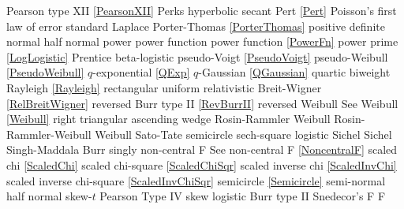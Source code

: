 Pearson type XII 				\dotfill	\eqref{PearsonXII}					\ncite	%
Perks						\dotfill	hyperbolic secant 					\ncite	%
Pert							\dotfill	\eqref{Pert} 						\ncite	%
Poisson's first law of error	\dotfill	standard Laplace					\ncite	%
Porter-Thomas					\dotfill	\eqref{PorterThomas}				\ncite
positive definite normal 		\dotfill	half normal 						\ncite 	%
power							\dotfill	power function 						\ncite	%
power function					\dotfill	\eqref{PowerFn}					\ncite	%
power prime					\dotfill	\eqref{LogLogistic}					\mcite{\self}
Prentice 						\dotfill	beta-logistic							
pseudo-Voigt					\dotfill	\eqref{PseudoVoigt}					\ncite
pseudo-Weibull					\dotfill	\eqref{PseudoWeibull}				\ncite	%
%
$q$-exponential				\dotfill	\eqref{QExp}						\ncite	%
$q$-Gaussian					\dotfill	\eqref{QGaussian}					\ncite	%
quartic						\dotfill	biweight							\ncite
%
Rayleigh  						\dotfill	\eqref{Rayleigh}					\ncite	%
rectangular					\dotfill	uniform 							\ncite	%
relativistic Breit-Wigner			\dotfill	\eqref{RelBreitWigner}				\ncite	%
reversed Burr type II				\dotfill	\eqref{RevBurrII} 					\ncite	%
reversed Weibull				\dotfill	See Weibull \eqref{Weibull}			\ncite	%
right triangular					\dotfill	ascending wedge 					\ncite	%
Rosin-Rammler 				\dotfill	Weibull							   		%
Rosin-Rammler-Weibull 			\dotfill	Weibull							\ncite	%
%
Sato-Tate						\dotfill	semicircle 						\ncite	%
sech-square 					\dotfill	logistic							\ncite	%
Sichel						\dotfill	Sichel							\ncite	
Singh-Maddala 					\dotfill	Burr 								\ncite	%
singly non-central F       			 \dotfill	See non-central F  \eqref{NoncentralF}	\ncite 
scaled chi						\dotfill	\eqref{ScaledChi}					\ncite	%
scaled chi-square 				\dotfill	\eqref{ScaledChiSqr}					\ncite	%
scaled inverse chi 				\dotfill	\eqref{ScaledInvChi}					\ncite	%
scaled inverse chi-square 			\dotfill	\eqref{ScaledInvChiSqr}				 	%
semicircle						\dotfill	\eqref{Semicircle}					\ncite	%
semi-normal 					\dotfill	half normal 						\ncite	%
skew-$t$						\dotfill	Pearson Type IV 					\ncite	%
skew logistic					\dotfill	Burr type II 						\ncite	%
Snedecor's F  					\dotfill	F 								\ncite	%
